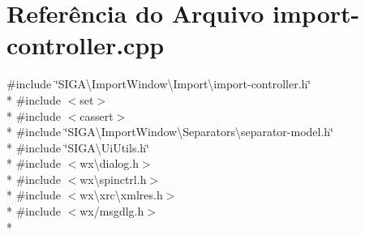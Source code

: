 \section{Referência do Arquivo import-\/controller.cpp}
\label{import-controller_8cpp}
{\ttfamily \#include \char`\"{}S\+I\+G\+A\textbackslash{}\+Import\+Window\textbackslash{}\+Import\textbackslash{}import-\/controller.\+h\char`\"{}}\\*
{\ttfamily \#include $<$set$>$}\\*
{\ttfamily \#include $<$cassert$>$}\\*
{\ttfamily \#include \char`\"{}S\+I\+G\+A\textbackslash{}\+Import\+Window\textbackslash{}\+Separators\textbackslash{}separator-\/model.\+h\char`\"{}}\\*
{\ttfamily \#include \char`\"{}S\+I\+G\+A\textbackslash{}\+Ui\+Utils.\+h\char`\"{}}\\*
{\ttfamily \#include $<$wx\textbackslash{}dialog.\+h$>$}\\*
{\ttfamily \#include $<$wx\textbackslash{}spinctrl.\+h$>$}\\*
{\ttfamily \#include $<$wx\textbackslash{}xrc\textbackslash{}xmlres.\+h$>$}\\*
{\ttfamily \#include $<$wx/msgdlg.\+h$>$}\\*
